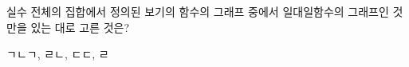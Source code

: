 \hspace*{2mm}\begin{minipage}[t]{\dimexpr\linewidth-2mm\relax}\vspace{0pt}
실수 전체의 집합에서 정의된 보기의 함수의 그래프 중에서 일대일함수의 그래프인 것만을 있는 대로 고른 것은?
\par\smallskip\begin{center}\resizebox{\ifdim\width>\linewidth\linewidth\else\width\fi}{!}{}\end{center}
\begin{choices32}{ㄱ}{ㄴ}{ㄱ, ㄹ}{ㄴ, ㄷ}{ㄷ, ㄹ}\end{choices32}\end{minipage}
